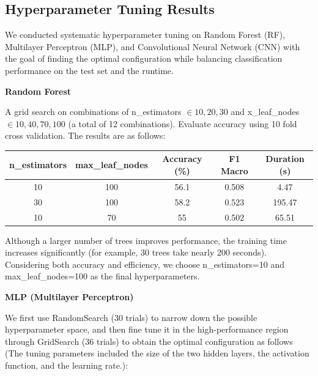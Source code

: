 \subsection{Hyperparameter Tuning Results}

 \noindent
 
We conducted systematic hyperparameter tuning on Random Forest (RF), Multilayer Perceptron (MLP), and Convolutional
 Neural Network (CNN) with the goal of finding the optimal configuration while balancing classification performance on the test set and the runtime.

\bigskip

 \noindent\textbf{Random Forest}
 
 A grid search on combinations of n\_estimators $\in{10, 20, 30}$ and x\_leaf\_nodes $\in{10, 40, 70, 100}$ (a total of 12 combinations). Evaluate accuracy using 10 fold cross validation. The results are as follows:

\begin{table}[h]
\centering
\begin{tabular}{ccccc}
\hline
n\_estimators & max\_leaf\_nodes & Accuracy (\%) & F1 Macro & Duration (s) \\ \hline
10            & 100              & 56.1            & 0.508    & 4.47        \\ \hline
30            & 100              & 58.2          & 0.523    & 195.47      \\ \hline
10            & 70              & 55            & 0.502    & 65.51        \\ \hline
\end{tabular}
\end{table}

\noindent 

Although a larger number of trees improves performance, the training time increases significantly (for example, 30 trees take nearly 200 seconds). Considering both accuracy and efficiency, we choose n\_estimators=10 and max\_leaf\_nodes=100 as the final hyperparameters.

\bigskip

 \noindent\textbf{MLP (Multilayer Perceptron)}

 We first use RandomSearch  (30 trials) to narrow down the possible hyperparameter space, and then fine tune it in the high-performance region through GridSearch (36 trials) to obtain the optimal configuration as follows (The tuning parameters included the size of the two hidden layers, the activation function, and the learning rate.):

